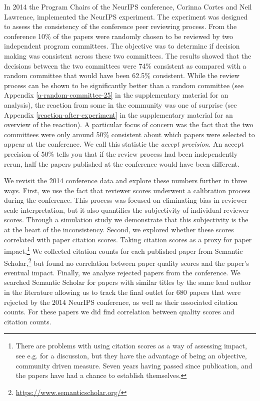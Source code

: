 \documentclass[twoside]{article}
\begin{document}
In 2014 the Program Chairs of the NeurIPS conference, Corinna Cortes
and Neil Lawrence, implemented the NeurIPS experiment. The experiment
was designed to assess the consistency of the conference peer
reviewing process. From the conference 10\% of the papers were
randomly chosen to be reviewed by two independent program
committees. The objective was to determine if decision making was
consistent across these two committees.  The results showed that the
decisions between the two committees were 74\% consistent as compared
with a random committee that would have been 62.5\% consistent. While
the review process can be shown to be significantly better than a
random committee (see Appendix \ref{a-random-committee-25} in the
supplementary material for an analysis), the reaction from some in the
community was one of surprise (see Appendix
\ref{reaction-after-experiment} in the supplementary material for an
overview of the reaction). A particular focus of concern was the fact that the two committees were only
around 50\% consistent about which papers were selected to appear at
the conference. We call this statistic the \emph{accept precision}. An accept precision of 50\% tells you  that if the review process had
been independently rerun, half the papers published at the conference
would have been different.

We revisit the 2014 conference data and explore these numbers further in three ways. First, we use the fact
that reviewer scores underwent a calibration process during the
conference. This process was focused on eliminating bias in reviewer
scale interpretation, but it also quantifies the subjectivity of
individual reviewer scores. Through a simulation study we demonstrate
that this subjectivity is the at the heart of the inconsistency. Second,
we explored whether these scores correlated with paper citation scores.
Taking citation scores as a proxy for paper impact,\footnote{There are
  problems with using citation scores as a way of assessing impact, see
  e.g. \cite{Neylon-article09} for a discussion, but they have the advantage
  of being an objective, community driven measure. Seven years
  having passed since publication, and the papers have had a chance to
  establish themselves.} We collected citation counts for each published
paper from Semantic Scholar,\footnote{\url{https://www.semanticscholar.org/}}
but found no correlation between paper quality scores and the paper's
eventual impact. Finally, we analyse rejected papers from the
conference. We searched Semantic Scholar for papers with similar titles
by the same lead author in the literature allowing us to track the final
outlet for 680 papers that were rejected by the 2014 NeurIPS conference,
as well as their associated citation counts. For these papers we did
find correlation between quality scores and citation counts.
\end{document}
